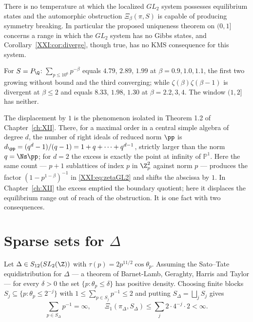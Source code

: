 \begin{corollary}\label{XXI:cor:cannot}
There is no temperature at which the localized $GL_2$ system possesses equilibrium states and
the automorphic obstruction $\Xi_\beta(\pi,S)$ is capable of producing symmetry breaking. In
particular the proposed uniqueness theorem on $(0,1]$ concerns a range in which the $GL_2$
system has no Gibbs states, and Corollary~\ref{XXI:cor:diverge}, though true, has no
$\mathrm{KMS}$ consequence for this system.
\end{corollary}

\begin{remark}\label{XXI:rem:num}
For $S=P_\Q$: $\sum_{p\le10^6}p^{-\beta}$ equals $4.79$, $2.89$, $1.99$ at
$\beta=0.9,1.0,1.1$, the first two growing without bound and the third converging; while
$\zeta(\beta)\zeta(\beta-1)$ is divergent at $\beta\le2$ and equals $8.33$, $1.98$, $1.30$ at
$\beta=2.2,3,4$. The window $(1,2]$ has neither.
\end{remark}

\begin{remark}\label{XXI:rem:mismatch}
The displacement by $1$ is the phenomenon isolated in Theorem 1.2 of Chapter~\ref{ch:XII}. There, for a
maximal order in a central simple algebra of degree $d$, the number of right ideals of reduced
norm $\pp$ is $d_\pp=(q^d-1)/(q-1)=1+q+\cdots+q^{d-1}$, strictly larger than the norm
$q=\Ns\pp$; for $d=2$ the excess is exactly the point at infinity of $\mathbb P^1$. Here the
same count --- $p+1$ sublattices of index $p$ in $\Z_p^2$ against norm $p$ --- produces the
factor $(1-p^{1-\beta})^{-1}$ in \eqref{XXI:eq:zetaGL2} and shifts the abscissa by $1$. In
Chapter~\ref{ch:XII} the excess emptied the boundary quotient; here it displaces the equilibrium
range out of reach of the obstruction. It is one fact with two consequences.
\end{remark}

\section{Sparse sets for $\Delta$}

\begin{theorem}\label{XXI:thm:sparse}
Let $\Delta\in S_{12}(SL_2(\Z))$ with $\tau(p)=2p^{11/2}\cos\theta_p$. Assuming the Sato--Tate
equidistribution for $\Delta$ --- a theorem of Barnet-Lamb, Geraghty, Harris and Taylor \cite{BLGHT} --- for
every $\delta>0$ the set $\{p:\theta_p\le\delta\}$ has positive density. Choosing finite
blocks $S_j\subseteq\{p:\theta_p\le2^{-j}\}$ with $1\le\sum_{p\in S_j}p^{-1}\le2$ and putting
$S_\Delta=\bigsqcup_jS_j$ gives
\[
\sum_{p\in S_\Delta}p^{-1}=\infty,\qquad \Xi_1(\pi_\Delta,S_\Delta)\le\sum_j2\cdot4^{-j}\cdot2<\infty .
\]
\end{theorem}

